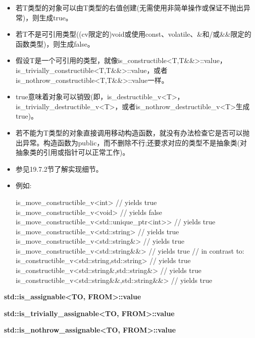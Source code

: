 \begin{itemize}
\item 
若T类型的对象可以由T类型的右值创建(无需使用非简单操作或保证不抛出异常)，则生成true。

\item 
若T不是可引用类型((cv限定的)void或使用const、volatile、\&和/或\&\&限定的函数类型)，则生成false。

\item 
假设T是一个可引用的类型，就像is\_constructible<T,T\&\&>::value，is\_trivially\_constructible<T,T\&\&>::value，或者is\_nothrow\_constructible<T,T\&\&>::value一样。

\item 
true意味着对象可以销毁(即，is\_destructible\_v<T>，is\_trivially\_destructible\_v<T>，或者is\_nothrow\_destructible\_v<T>生成true)。

\item 
若不能为T类型的对象直接调用移动构造函数，就没有办法检查它是否可以抛出异常。构造函数为public，而不删除不行;还要求对应的类型不是抽象类(对抽象类的引用或指针可以正常工作)。

\item 
参见19.7.2节了解实现细节。

\item 
例如:
\begin{cpp}
is_move_constructible_v<int> // yields true
is_move_constructible_v<void> // yields false
is_move_constructible_v<std::unique_ptr<int>> // yields true
is_move_constructible_v<std::string> // yields true
is_move_constructible_v<std::string&> // yields true
is_move_constructible_v<std::string&&> // yields true
// in contrast to:
is_constructible_v<std::string,std::string> // yields true
is_constructible_v<std::string&,std::string&> // yields true
is_constructible_v<std::string&&,std::string&&> // yields true
\end{cpp}
\end{itemize}

\textbf{std::is\_assignable<TO, FROM>::value}

\textbf{std::is\_trivially\_assignable<TO, FROM>::value}

\textbf{std::is\_nothrow\_assignable<TO, FROM>::value}

